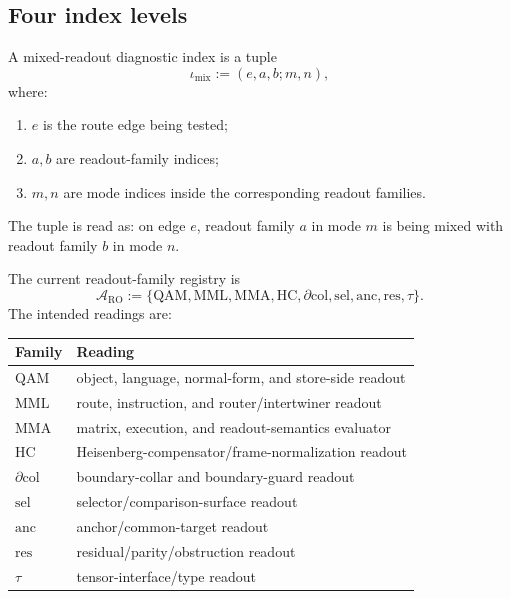 \subsection{Four index levels}
\label{subsec:v410r19-four-index-levels}

\begin{definition}
\label{def:v410r19-mixed-readout-index-tuple}
A mixed-readout diagnostic index is a tuple
\[
 \iota_{\mathrm{mix}}
 :=
 (e,a,b;m,n),
\]
where:
\begin{enumerate}[leftmargin=*]
 \item \(e\) is the route edge being tested;
 \item \(a,b\) are readout-family indices;
 \item \(m,n\) are mode indices inside the corresponding readout families.
\end{enumerate}
The tuple is read as: on edge \(e\), readout family \(a\) in mode \(m\) is
being mixed with readout family \(b\) in mode \(n\).
\end{definition}

\begin{definition}
\label{def:v410r19-readout-family-registry}
The current readout-family registry is
\[
 \mathcal A_{\mathrm{RO}}
 :=
 \{
 \mathrm{QAM},\mathrm{MML},\mathrm{MMA},\mathrm{HC},
 \partial\mathrm{col},\mathrm{sel},\mathrm{anc},\mathrm{res},\tau
 \}.
\]
The intended readings are:
\begin{center}
\small
\begin{tabular}{@{}ll@{}}
\toprule
Family & Reading\\
\midrule
\(\mathrm{QAM}\) & object, language, normal-form, and store-side readout\\
\(\mathrm{MML}\) & route, instruction, and router/intertwiner readout\\
\(\mathrm{MMA}\) & matrix, execution, and readout-semantics evaluator\\
\(\mathrm{HC}\) & Heisenberg-compensator/frame-normalization readout\\
\(\partial\mathrm{col}\) & boundary-collar and boundary-guard readout\\
\(\mathrm{sel}\) & selector/comparison-surface readout\\
\(\mathrm{anc}\) & anchor/common-target readout\\
\(\mathrm{res}\) & residual/parity/obstruction readout\\
\(\tau\) & tensor-interface/type readout\\
\bottomrule
\end{tabular}
\end{center}
\end{definition}

